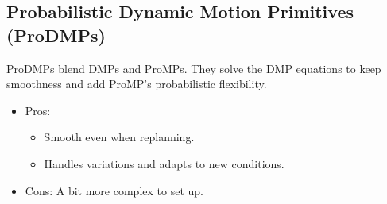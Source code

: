 \subsection{Probabilistic Dynamic Motion Primitives (ProDMPs)}
ProDMPs blend DMPs and ProMPs. They solve the DMP equations to keep smoothness and add 
ProMP’s probabilistic flexibility.
\begin{itemize}
    \item Pros: \begin{itemize}
        \item Smooth even when replanning.
        \item Handles variations and adapts to new conditions.
    \end{itemize}
    \item Cons: A bit more complex to set up.
\end{itemize}